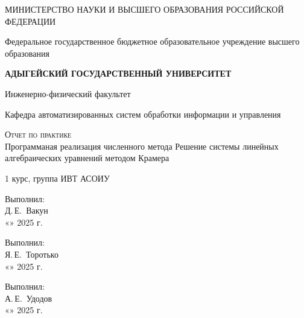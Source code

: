 \documentclass[12pt,a4paper]{scrartcl}
\begin{document}
	\begin{titlepage}
		\begin{center}
			\large
			МИНИСТЕРСТВО НАУКИ И ВЫСШЕГО ОБРАЗОВАНИЯ РОССИЙСКОЙ ФЕДЕРАЦИИ
			
			Федеральное государственное бюджетное образовательное учреждение высшего образования
			
			\textbf{АДЫГЕЙСКИЙ ГОСУДАРСТВЕННЫЙ УНИВЕРСИТЕТ}
			\vspace{0.25cm}
			
			Инженерно-физический факультет
			
			Кафедра автоматизированных систем обработки информации и управления
			\vfill
			
			\vfill
			
			\textsc{Отчет по практике}\\[5mm]
			
			{\LARGE Программаная реализация численного метода Решение системы линейных алгебраических уравнений методом Крамера }
			\bigskip
			
			1 курс, группа ИВТ АСОИУ
		\end{center}
		\vfill
		
		\newlength{\ML}
		\hfill\begin{minipage}{0.5\textwidth}
			Выполнил:\\
			\underline{\hspace{\ML}} Д.\,Е.~Вакун\\
			«\underline{\hspace{0.7cm}}» \underline{\hspace{2cm}} 2025 г.
		\end{minipage}%
		\bigskip
		
		\hfill\begin{minipage}{0.5\textwidth}
			Выполнил:\\
			\underline{\hspace{\ML}} Я.\,Е.~Торотько\\
			«\underline{\hspace{0.7cm}}» \underline{\hspace{2cm}} 2025 г.
		\end{minipage}%
		\bigskip
		
		\hfill\begin{minipage}{0.5\textwidth}
			Выполнил:\\
			\underline{\hspace{\ML}} А.\,Е.~Удодов\\
			«\underline{\hspace{0.7cm}}» \underline{\hspace{2cm}} 2025 г.
		\end{minipage}%
		\bigskip
		

\end{titlepage}
\end{document}
